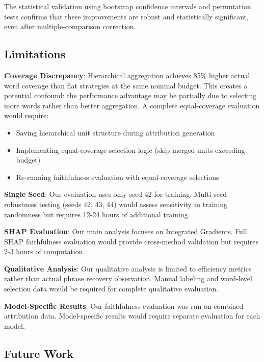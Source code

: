 \documentclass[journal]{IEEEtran}
\begin{document}
The statistical validation using bootstrap confidence intervals and permutation tests confirms that these improvements are robust and statistically significant, even after multiple-comparison correction.

\subsection{Limitations}

\textbf{Coverage Discrepancy}: Hierarchical aggregation achieves 85\% higher actual word coverage than flat strategies at the same nominal budget. This creates a potential confound: the performance advantage may be partially due to selecting more words rather than better aggregation. A complete equal-coverage evaluation would require:
\begin{itemize}
    \item Saving hierarchical unit structure during attribution generation
    \item Implementing equal-coverage selection logic (skip merged units exceeding budget)
    \item Re-running faithfulness evaluation with equal-coverage selections
\end{itemize}

\textbf{Single Seed}: Our evaluation uses only seed 42 for training. Multi-seed robustness testing (seeds 42, 43, 44) would assess sensitivity to training randomness but requires 12-24 hours of additional training.

\textbf{SHAP Evaluation}: Our main analysis focuses on Integrated Gradients. Full SHAP faithfulness evaluation would provide cross-method validation but requires 2-3 hours of computation.

\textbf{Qualitative Analysis}: Our qualitative analysis is limited to efficiency metrics rather than actual phrase recovery observation. Manual labeling and word-level selection data would be required for complete qualitative evaluation.

\textbf{Model-Specific Results}: Our faithfulness evaluation was run on combined attribution data. Model-specific results would require separate evaluation for each model.

\subsection{Future Work}
\end{document}
